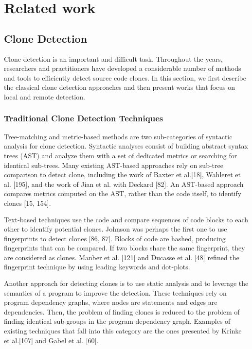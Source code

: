 \documentclass[12pt]{report}
\begin{document}
\chapter{Related work}\label{related-work}

\section{Clone Detection}\label{clone-detection}

Clone detection is an important and difficult task. Throughout the
years, researchers and practitioners have developed a considerable
number of methods and tools to efficiently detect source code clones. In
this section, we first describe the classical clone detection approaches
and then present works that focus on local and remote detection.

\subsection{Traditional Clone Detection
Techniques}\label{traditional-clone-detection-techniques}

Tree-matching and metric-based methods are two sub-categories of
syntactic analysis for clone detection. Syntactic analyses consist of
building abstract syntax trees (AST) and analyze them with a set of
dedicated metrics or searching for identical sub-trees. Many existing
AST-based approaches rely on sub-tree comparison to detect clone,
including the work of Baxter et al.{[}18{]}, Wahleret et al. {[}195{]},
and the work of Jian et al. with Deckard {[}82{]}. An AST-based approach
compares metrics computed on the AST, rather than the code itself, to
identify clones {[}15, 154{]}.

Text-based techniques use the code and compare sequences of code blocks
to each other to identify potential clones. Johnson was perhaps the
first one to use fingerprints to detect clones {[}86, 87{]}. Blocks of
code are hashed, producing fingerprints that can be compared. If two
blocks share the same fingerprint, they are considered as clones. Manber
et al. {[}121{]} and Ducasse et al. {[}48{]} refined the fingerprint
technique by using leading keywords and dot-plots.

Another approach for detecting clones is to use static analysis and to
leverage the semantics of a program to improve the detection. These
techniques rely on program dependency graphs, where nodes are statements
and edges are dependencies. Then, the problem of finding clones is
reduced to the problem of finding identical sub-groups in the program
dependency graph. Examples of existing techniques that fall into this
category are the ones presented by Krinke et al.{[}107{]} and Gabel et
al. {[}60{]}.
\end{document}
